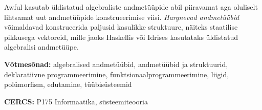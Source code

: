 \documentclass[12pt]{article}
\begin{document}
  Awful kasutab üldistatud algebraliste andmetüüpide abil piiravamat aga oluliselt lihtsamat uut andmetüüpide konstrueerimise viisi. \textit{Hargnevad andmetüübid} võimaldavad konstrueerida paljusid kasulikke struktuure, näiteks staatilise pikkusega vektoreid, mille jaoks Haskellis või Idrises kasutataks üldistatud algebralisi andmetüüpe.

  \vspace*{1ex}

  \noindent
  \textbf{Võtmesõnad:} algebralised andmetüübid, andmetüübid ja struktuurid, deklaratiivne programmeerimine, funktsionaalprogrammeerimine, liigid, polümorfism, edutamine, tüübisüsteemid

  \vspace*{1ex}

  \noindent
  \textbf{CERCS:} P175 Informaatika, süsteemiteooria

  \vspace*{3ex}
\end{document}
